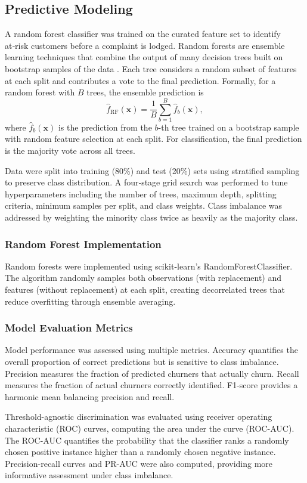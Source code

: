 \documentclass[12pt]{article}
\begin{document}
\subsection{Predictive Modeling}
A random forest classifier was trained on the curated feature set to identify at‑risk customers before a complaint is lodged. Random forests are ensemble learning techniques that combine the output of many decision trees built on bootstrap samples of the data \citep{geeksforgeeks_randomforest}. Each tree considers a random subset of features at each split and contributes a vote to the final prediction. Formally, for a random forest with \(B\) trees, the ensemble prediction is
\[ \hat{f}_{\text{RF}}(\mathbf{x}) = \frac{1}{B} \sum_{b=1}^{B} \hat{f}_b(\mathbf{x}), \]
where \(\hat{f}_b(\mathbf{x})\) is the prediction from the \(b\)-th tree trained on a bootstrap sample with random feature selection at each split. For classification, the final prediction is the majority vote across all trees.

Data were split into training (80\%) and test (20\%) sets using stratified sampling to preserve class distribution. A four‑stage grid search was performed to tune hyperparameters including the number of trees, maximum depth, splitting criteria, minimum samples per split, and class weights. Class imbalance was addressed by weighting the minority class twice as heavily as the majority class.

\subsubsection{Random Forest Implementation}
Random forests were implemented using scikit-learn's RandomForestClassifier. The algorithm randomly samples both observations (with replacement) and features (without replacement) at each split, creating decorrelated trees that reduce overfitting through ensemble averaging.

\subsubsection{Model Evaluation Metrics}
Model performance was assessed using multiple metrics. Accuracy quantifies the overall proportion of correct predictions but is sensitive to class imbalance. Precision measures the fraction of predicted churners that actually churn. Recall measures the fraction of actual churners correctly identified. F1-score provides a harmonic mean balancing precision and recall.

Threshold-agnostic discrimination was evaluated using receiver operating characteristic (ROC) curves, computing the area under the curve (ROC-AUC). The ROC-AUC quantifies the probability that the classifier ranks a randomly chosen positive instance higher than a randomly chosen negative instance. Precision-recall curves and PR-AUC were also computed, providing more informative assessment under class imbalance.
\end{document}
